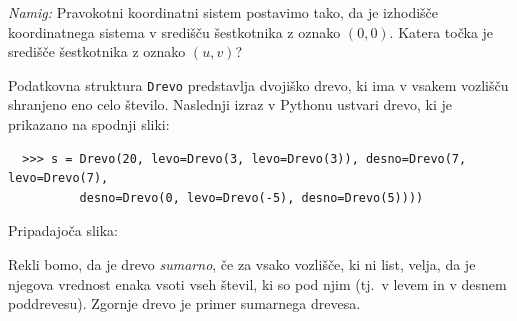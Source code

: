 \documentclass[arhiv]{../izpit}
\begin{document}
\vspace{\baselineskip}

\noindent \emph{Namig:} Pravokotni koordinatni sistem postavimo tako, da je izhodišče koordinatnega sistema v središču šestkotnika z oznako $(0, 0)$. Katera točka je središče šestkotnika z oznako $(u, v)$?



Podatkovna struktura \texttt{Drevo} predstavlja dvojiško drevo, ki ima v vsakem vozlišču shranjeno eno celo število. Naslednji izraz v Pythonu ustvari drevo, ki je prikazano na spodnji sliki:
%
\begin{verbatim}
  >>> s = Drevo(20, levo=Drevo(3, levo=Drevo(3)), desno=Drevo(7, levo=Drevo(7),
          desno=Drevo(0, levo=Drevo(-5), desno=Drevo(5))))
\end{verbatim}

\noindent Pripadajoča slika:
\vspace{-0.4cm}
\begin{center}
\end{center}
%
Rekli bomo, da je drevo \emph{sumarno}, če za vsako vozlišče, ki ni list, velja, da je njegova vrednost enaka vsoti vseh števil, ki so pod njim (tj.\ v levem in v desnem poddrevesu). Zgornje drevo je primer sumarnega drevesa.
\end{document}
